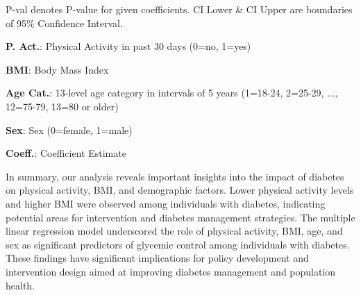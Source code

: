 \documentclass[11pt]{article}
\begin{document}
\begin{table}[h]
\caption{Multiple Linear Regression Model predicting glycemic control among individuals with diabetes, adjusting for age, sex, and BMI.}
\label{table:table_1}
\begin{threeparttable}
\renewcommand{\TPTminimum}{\linewidth}
\begin{tablenotes}
\footnotesize
\item P-val denotes P-value for given coefficients. CI Lower \& CI Upper are boundaries of 95\% Confidence Interval.
\item \textbf{P. Act.}: Physical Activity in past 30 days (0=no, 1=yes)
\item \textbf{BMI}: Body Mass Index
\item \textbf{Age Cat.}: 13-level age category in intervals of 5 years (1=18-24, 2=25-29, ..., 12=75-79, 13=80 or older)
\item \textbf{Sex}: Sex (0=female, 1=male)
\item \textbf{Coeff.}: Coefficient Estimate
\end{tablenotes}
\end{threeparttable}
\end{table}


In summary, our analysis reveals important insights into the impact of diabetes on physical activity, BMI, and demographic factors. Lower physical activity levels and higher BMI were observed among individuals with diabetes, indicating potential areas for intervention and diabetes management strategies. The multiple linear regression model underscored the role of physical activity, BMI, age, and sex as significant predictors of glycemic control among individuals with diabetes. These findings have significant implications for policy development and intervention design aimed at improving diabetes management and population health.
\end{document}
